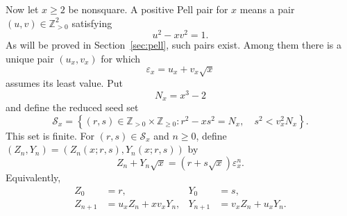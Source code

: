 \documentclass[11pt,a4paper]{amsart}
\theoremstyle{definition}
\newcommand{\Z}{\mathbb Z}
\newcommand{\Scal}{\mathcal S}
\newcommand{\eps}{\varepsilon}
\numberwithin{equation}{section}
\begin{document}
Now let \(x\geq2\) be nonsquare.  A positive Pell pair for \(x\) means a pair
\((u,v)\in\Z_{>0}^2\) satisfying
\begin{equation}
 u^2-xv^2=1.
 \label{eq:Pell-x}
\end{equation}
As will be proved in Section~\ref{sec:pell}, such pairs exist.  Among them there is a
unique pair \((u_x,v_x)\) for which
\begin{equation}
 \eps_x=u_x+v_x\sqrt{x}
 \label{eq:fundamental-unit}
\end{equation}
assumes its least value.  Put
\begin{equation}
 N_x=x^3-2
 \label{eq:Nx}
\end{equation}
and define the reduced seed set
\begin{equation}
 \Scal_x=
 \left\{
 (r,s)\in\Z_{>0}\times\Z_{\geq0}:
 r^2-xs^2=N_x,\quad s^2<v_x^2N_x
 \right\}.
 \label{eq:Sx}
\end{equation}
This set is finite.  For \((r,s)\in\Scal_x\) and \(n\geq0\), define
\((Z_n,Y_n)=(Z_n(x;r,s),Y_n(x;r,s))\) by
\begin{equation}
 Z_n+Y_n\sqrt{x}=(r+s\sqrt{x})\eps_x^n.
 \label{eq:Pell-param}
\end{equation}
Equivalently,
\begin{equation}
 \begin{aligned}
 Z_0&=r, & Y_0&=s,\\
 Z_{n+1}&=u_xZ_n+xv_xY_n,
 &Y_{n+1}&=v_xZ_n+u_xY_n.
 \end{aligned}
 \label{eq:recurrence}
\end{equation}
\end{document}
